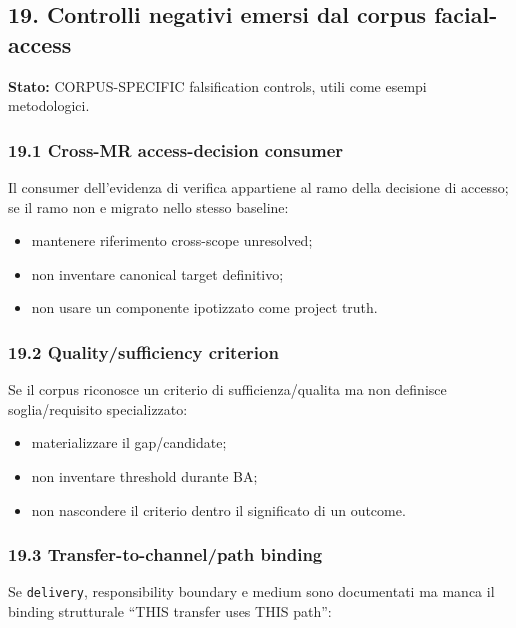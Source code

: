 \documentclass[
  9pt,
  a4paper,
]{article}
\providecommand{\tightlist}{%
  \setlength{\itemsep}{0pt}\setlength{\parskip}{0pt}}
\begin{document}
\subsection{19. Controlli negativi emersi dal corpus
facial-access}\label{controlli-negativi-emersi-dal-corpus-facial-access}

\textbf{Stato:} CORPUS-SPECIFIC falsification controls, utili come
esempi metodologici.

\subsubsection{19.1 Cross-MR access-decision
consumer}\label{cross-mr-access-decision-consumer}

Il consumer dell'evidenza di verifica appartiene al ramo della decisione
di accesso; se il ramo non e migrato nello stesso baseline:

\begin{itemize}
\tightlist
\item
  mantenere riferimento cross-scope unresolved;
\item
  non inventare canonical target definitivo;
\item
  non usare un componente ipotizzato come project truth.
\end{itemize}

\subsubsection{19.2 Quality/sufficiency
criterion}\label{qualitysufficiency-criterion}

Se il corpus riconosce un criterio di sufficienza/qualita ma non
definisce soglia/requisito specializzato:

\begin{itemize}
\tightlist
\item
  materializzare il gap/candidate;
\item
  non inventare threshold durante BA;
\item
  non nascondere il criterio dentro il significato di un outcome.
\end{itemize}

\subsubsection{19.3 Transfer-to-channel/path
binding}\label{transfer-to-channelpath-binding}

Se \texttt{delivery}, responsibility boundary e medium sono documentati
ma manca il binding strutturale ``THIS transfer uses THIS path'':
\end{document}
